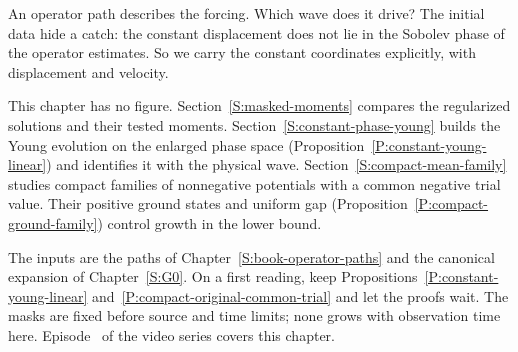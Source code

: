 An operator path describes the forcing. Which wave does it drive? The initial
data hide a catch: the constant displacement does not lie in the Sobolev phase
of the operator estimates. So we carry the constant coordinates explicitly,
with displacement and velocity.

This chapter has no figure. Section~\ref{S:masked-moments}
compares the regularized solutions and their tested
moments. Section~\ref{S:constant-phase-young} builds the Young evolution on
the enlarged phase space (Proposition~\ref{P:constant-young-linear}) and
identifies it with the physical wave. Section~\ref{S:compact-mean-family}
studies compact families of nonnegative potentials with a common
negative trial value. Their positive ground states and uniform gap
(Proposition~\ref{P:compact-ground-family}) control growth in the lower bound.

The inputs are the paths of Chapter~\ref{S:book-operator-paths}
and the canonical expansion of Chapter~\ref{S:G0}. On a
first reading, keep Propositions~\ref{P:constant-young-linear}
and~\ref{P:compact-original-common-trial} and let the proofs wait. The
masks are fixed before source and time limits; none grows with observation
time here. Episode~ of the video series covers
this chapter.
